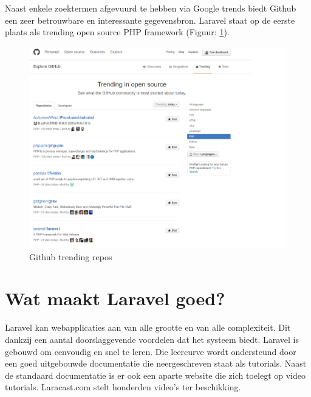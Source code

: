 \pagebreak
\noindent
Naast enkele zoektermen afgevuurd te hebben via Google trends biedt Github een zeer betrouwbare en interessante gegevensbron. Laravel staat op de eerste plaats als trending open source PHP framework (Figuur: \ref{fig:Github trending repos}). 

\begin{figure}[!h]
  \includegraphics[width=\textwidth]{img/trending_repos.png}
  \centering
  \caption{Github trending repos}
  \label{fig:Github trending repos}
\end{figure}

\section{Wat maakt Laravel goed?}
Laravel kan webapplicaties aan van alle grootte en van alle complexiteit. Dit dankzij een aantal doorslaggevende voordelen dat het systeem biedt. Laravel is gebouwd om eenvoudig en snel te leren. Die leercurve wordt ondersteund door een goed uitgebouwde documentatie die neergeschreven staat als tutorials. Naast de standaard documentatie is er ook een aparte website die zich toelegt op video tutorials. Laracast.com stelt honderden video's ter beschikking. 

